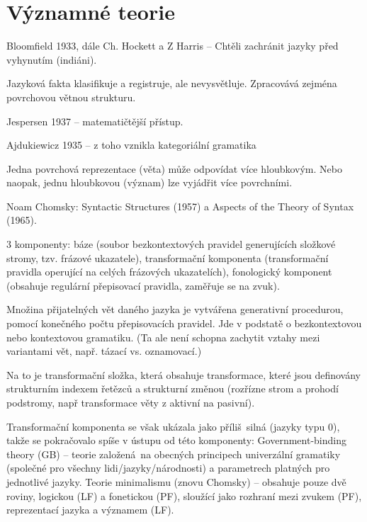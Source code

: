 \documentclass[12pt]{article}					%
\begin{document}

\section{Významné teorie}
\begin{definice}[Deskriptivismus]
	Bloomfield 1933, dále Ch. Hockett a Z Harris – Chtěli zachránit jazyky před vyhynutím (indiáni).

	Jazyková fakta klasifikuje a registruje, ale nevysvětluje. Zpracovává zejména povrchovou větnou strukturu. 
\end{definice}

\begin{definice}
	Jespersen 1937 – matematičtější přístup.
\end{definice}

\begin{definice}
	Ajdukiewicz 1935 – z toho vznikla kategoriální gramatika
\end{definice}

\begin{definice}
	Jedna povrchová reprezentace (věta) může odpovídat více hloubkovým. Nebo naopak, jednu hloubkovou (význam) lze vyjádřit více povrchními.
\end{definice}

\begin{definice}
	Noam Chomsky: Syntactic Structures (1957) a Aspects of the Theory of Syntax (1965).

	3 komponenty: báze (soubor bezkontextových pravidel generujících složkové stromy, tzv. frázové ukazatele), transformační komponenta (transformační pravidla operující na celých frázových ukazatelích), fonologický komponent (obsahuje regulární přepisovací pravidla, zaměřuje se na zvuk).

	Množina přijatelných vět daného jazyka je vytvářena generativní procedurou, pomocí konečného počtu přepisovacích pravidel. Jde v podstatě o bezkontextovou nebo kontextovou gramatiku. (Ta ale není schopna zachytit vztahy mezi variantami vět, např. tázací vs. oznamovací.)

	Na to je transformační složka, která obsahuje transformace, které jsou definovány strukturním indexem řetězců a strukturní změnou (rozřízne strom a prohodí podstromy, např transformace věty z aktivní na pasivní).

	Transformační komponenta se však ukázala jako příliš silná (jazyky typu 0), takže se pokračovalo spíše v ústupu od této komponenty: Government-binding theory (GB) – teorie založená na obecných principech univerzální gramatiky (společné pro všechny lidi/jazyky/národnosti) a parametrech platných pro jednotlivé jazyky. Teorie minimalismu (znovu Chomsky) – obsahuje pouze dvě roviny, logickou (LF) a fonetickou (PF), sloužící jako rozhraní mezi zvukem (PF), reprezentací jazyka a významem (LF).
\end{definice}
\end{document}
